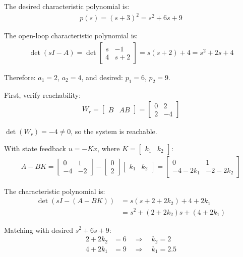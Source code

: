 \documentclass[11pt,a4paper]{article}
\begin{document}
The desired characteristic polynomial is:
\begin{align}
p(s) = (s+3)^2 = s^2 + 6s + 9
\end{align}

The open-loop characteristic polynomial is:
\begin{align}
\det(sI - A) = \det\begin{bmatrix} s & -1 \\ 4 & s+2 \end{bmatrix} = s(s+2) + 4 = s^2 + 2s + 4
\end{align}

Therefore: $a_1 = 2$, $a_2 = 4$, and desired: $p_1 = 6$, $p_2 = 9$.

First, verify reachability:
\begin{align}
W_r = \begin{bmatrix} B & AB \end{bmatrix} = \begin{bmatrix} 0 & 2 \\ 2 & -4 \end{bmatrix}
\end{align}

$\det(W_r) = -4 \neq 0$, so the system is reachable.

With state feedback $u = -Kx$, where $K = \begin{bmatrix} k_1 & k_2 \end{bmatrix}$:
\begin{align}
A - BK = \begin{bmatrix} 0 & 1 \\ -4 & -2 \end{bmatrix} - \begin{bmatrix} 0 \\ 2 \end{bmatrix}\begin{bmatrix} k_1 & k_2 \end{bmatrix} = \begin{bmatrix} 0 & 1 \\ -4-2k_1 & -2-2k_2 \end{bmatrix}
\end{align}

The characteristic polynomial is:
\begin{align}
\det(sI - (A-BK)) &= s(s+2+2k_2) + 4+2k_1 \\
&= s^2 + (2+2k_2)s + (4+2k_1)
\end{align}

Matching with desired $s^2 + 6s + 9$:
\begin{align}
2 + 2k_2 &= 6 \quad \Rightarrow \quad k_2 = 2 \\
4 + 2k_1 &= 9 \quad \Rightarrow \quad k_1 = 2.5
\end{align}
\end{document}
